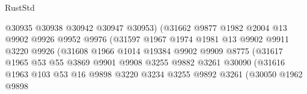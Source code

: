 \begin{lexlean}{RustStd}
\begin{coremodule}
                                      @30935
                                      @30938
                                      @30942
                                      @30947
                                      @30953)
                                    (@31662
                                      @9877
                                      @1982
                                      @2004
                                      @13
                                      @9902
                                      @9926
                                      @9952
                                      @9976
                                      (@31597
                                        @1967
                                        @1974
                                        @1981
                                        @13
                                        @9902
                                        @9911
                                        @3220
                                        @9926
                                        (@31608
                                          @1966
                                          @1014
                                          @19384
                                          @9902
                                          @9909
                                          @8775
                                          (@31617
                                            @1965
                                            @53
                                            @55
                                            @3869
                                            @9901
                                            @9908
                                            @3255
                                            @9882
                                            @3261
                                            @30090
                                            (@31616
                                              @1963
                                              @103
                                              @53
                                              @16
                                              @9898
                                              @3220
                                              @3234
                                              @3255
                                              @9892
                                              @3261
                                              (@30050
                                                @1962
                                                @9898

\end{coremodule}
\end{lexlean}
